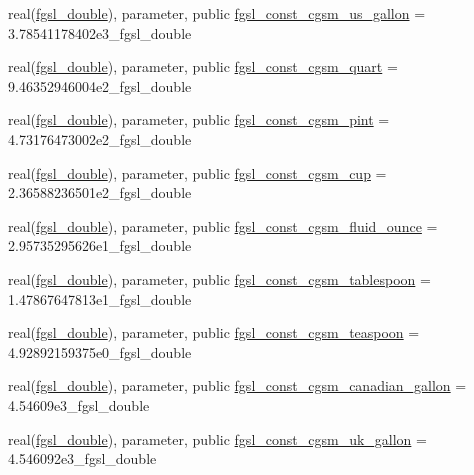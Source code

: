 \begin{DoxyCompactItemize}
real(\hyperlink{namespacefgsl_a9af5113378e0f000eb479d3f90196ddf}{fgsl\+\_\+double}), parameter, public \hyperlink{namespacefgsl_a9fdaf0160e636b5a341738f1038e6671}{fgsl\+\_\+const\+\_\+cgsm\+\_\+us\+\_\+gallon} = 3.\+78541178402e3\+\_\+fgsl\+\_\+double
\item 
real(\hyperlink{namespacefgsl_a9af5113378e0f000eb479d3f90196ddf}{fgsl\+\_\+double}), parameter, public \hyperlink{namespacefgsl_a1dd9210eaaf96e8f99597ede1f808892}{fgsl\+\_\+const\+\_\+cgsm\+\_\+quart} = 9.\+46352946004e2\+\_\+fgsl\+\_\+double
\item 
real(\hyperlink{namespacefgsl_a9af5113378e0f000eb479d3f90196ddf}{fgsl\+\_\+double}), parameter, public \hyperlink{namespacefgsl_a77fc850550f8adbaa35a17890fe1ddb6}{fgsl\+\_\+const\+\_\+cgsm\+\_\+pint} = 4.\+73176473002e2\+\_\+fgsl\+\_\+double
\item 
real(\hyperlink{namespacefgsl_a9af5113378e0f000eb479d3f90196ddf}{fgsl\+\_\+double}), parameter, public \hyperlink{namespacefgsl_aa3f891d5605128364396d3ae108b3d43}{fgsl\+\_\+const\+\_\+cgsm\+\_\+cup} = 2.\+36588236501e2\+\_\+fgsl\+\_\+double
\item 
real(\hyperlink{namespacefgsl_a9af5113378e0f000eb479d3f90196ddf}{fgsl\+\_\+double}), parameter, public \hyperlink{namespacefgsl_ada803a980994f045ecc9fa32cebad23b}{fgsl\+\_\+const\+\_\+cgsm\+\_\+fluid\+\_\+ounce} = 2.\+95735295626e1\+\_\+fgsl\+\_\+double
\item 
real(\hyperlink{namespacefgsl_a9af5113378e0f000eb479d3f90196ddf}{fgsl\+\_\+double}), parameter, public \hyperlink{namespacefgsl_ad8c01acfc1ba5ba62f1c97aa1b0d8142}{fgsl\+\_\+const\+\_\+cgsm\+\_\+tablespoon} = 1.\+47867647813e1\+\_\+fgsl\+\_\+double
\item 
real(\hyperlink{namespacefgsl_a9af5113378e0f000eb479d3f90196ddf}{fgsl\+\_\+double}), parameter, public \hyperlink{namespacefgsl_a46a096885f2709ea27ce6f1b8f59c279}{fgsl\+\_\+const\+\_\+cgsm\+\_\+teaspoon} = 4.\+92892159375e0\+\_\+fgsl\+\_\+double
\item 
real(\hyperlink{namespacefgsl_a9af5113378e0f000eb479d3f90196ddf}{fgsl\+\_\+double}), parameter, public \hyperlink{namespacefgsl_a3a07299d97f40e47785e44126a457907}{fgsl\+\_\+const\+\_\+cgsm\+\_\+canadian\+\_\+gallon} = 4.\+54609e3\+\_\+fgsl\+\_\+double
\item 
real(\hyperlink{namespacefgsl_a9af5113378e0f000eb479d3f90196ddf}{fgsl\+\_\+double}), parameter, public \hyperlink{namespacefgsl_aaa815df0586e577834ad13d9b6dd8218}{fgsl\+\_\+const\+\_\+cgsm\+\_\+uk\+\_\+gallon} = 4.\+546092e3\+\_\+fgsl\+\_\+double

\end{DoxyCompactItemize}
